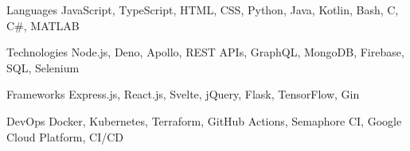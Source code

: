 

\begin{cvskills}

  \cvskill
    {Languages} %
    {JavaScript, TypeScript, HTML, CSS, Python, Java, Kotlin, Bash, C, C\#, MATLAB } %

  \cvskill
    {Technologies} %
    {Node.js, Deno, Apollo, REST APIs, GraphQL, MongoDB, Firebase, SQL, Selenium} %

  \cvskill
    {Frameworks} %
    {Express.js, React.js, Svelte, jQuery, Flask, TensorFlow, Gin} %

  \cvskill
    {DevOps} %
    {Docker, Kubernetes, Terraform, GitHub Actions, Semaphore CI, Google Cloud Platform, CI/CD} %

\end{cvskills}
